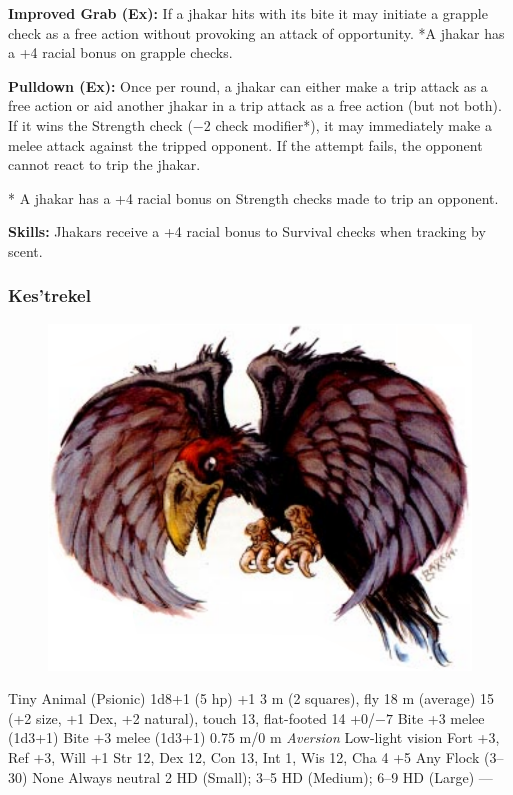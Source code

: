 \textbf{Improved Grab (Ex):} If a jhakar hits with its bite it may initiate a grapple check as a free action without provoking an attack of opportunity. *A jhakar has a +4 racial bonus on grapple checks.

\textbf{Pulldown (Ex):} Once per round, a jhakar can either make a trip attack as a free action or aid another jhakar in a trip attack as a free action (but not both). If it wins the Strength check ($-2$ check modifier*), it may immediately make a melee attack against the tripped opponent. If the attempt fails, the opponent cannot react to trip the jhakar.

* A jhakar has a +4 racial bonus on Strength checks made to trip an opponent.

\textbf{Skills:} Jhakars receive a +4 racial bonus to Survival checks when tracking by scent.

\subsubsection{Kes'trekel}
\begin{figure}[b!]
\centering
\includegraphics[width=\columnwidth]{images/kes-trekel.png}
\WOTC
\end{figure}

\begin{MonsterStats}
{Tiny Animal (Psionic)}
{1d8+1 (5 hp)}
{+1}
{3 m (2 squares), fly 18 m (average)}
{15 (+2 size, +1 Dex, +2 natural), touch 13, flat-footed 14}
{+0/$-7$}
{Bite +3 melee (1d3+1)}
{Bite +3 melee (1d3+1)}
{0.75 m/0 m}
{\emph{Aversion}}
{Low-light vision}
{Fort +3, Ref +3, Will +1}
{Str 12, Dex 12, Con 13, Int 1, Wis 12, Cha 4}
{ +5}
{}
{Any}
{Flock (3--30)}
{\onehalf}
{None}
{Always neutral}
{2 HD (Small); 3--5 HD (Medium); 6--9 HD (Large)}
{---}
\end{MonsterStats}

